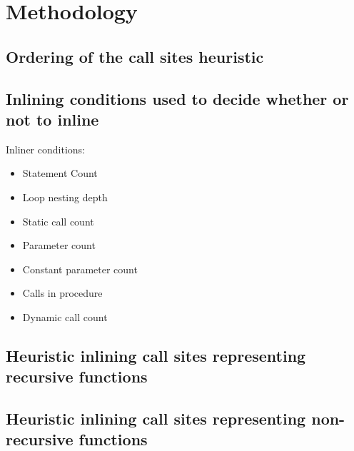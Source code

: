 
\clearpage
\section{Methodology}
\label{sec:methodology}



\subsection{Ordering of the call sites heuristic}
\label{sub:method:apply_node_ordering_heur}

\subsection{Inlining conditions used to decide whether or not to inline}

Inliner conditions:

\begin{itemize}

	\item Statement Count

	\item Loop nesting depth

	\item Static call count

	\item Parameter count

	\item Constant parameter count

	\item Calls in procedure

	\item {} Dynamic call count

\end{itemize}

\subsection{Heuristic inlining call sites representing recursive functions}
\label{sub:method:recur_apply_node_inlining_heur}

\subsection{Heuristic inlining call sites representing non-recursive functions}
\label{sub:method:apply_node_inlining_heur}
